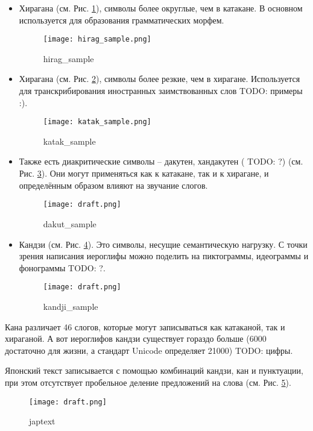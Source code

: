 \documentclass[14pt,russian]{extreport}
\theoremstyle{definition}
\newcommand{\todo}[1]{}
\renewcommand{\todo}[1]{{\color{red} TODO: {#1}}}
\begin{document}
\begin{itemize}
	\item Хирагана (см. Рис. \ref{fig:hirag_sample}), символы более округлые, чем в катакане. В основном используется для образования грамматических морфем.
	\begin{figure}[H]
		\centering
		\texttt{[image: hirag\_sample.png]}
		\caption{hirag\_sample}
		\label{fig:hirag_sample}
	\end{figure}
	
	\item Хирагана (см. Рис. \ref{fig:katak_sample}), символы более резкие, чем в хирагане. Используется для транскрибирования иностранных заимствованных слов \todo{примеры :)}.
	\begin{figure}[H]
		\centering
		\texttt{[image: katak\_sample.png]}
		\caption{katak\_sample}
		\label{fig:katak_sample}
	\end{figure}

	\item Также есть диакритические символы -- дакутен, хандакутен (\todo{?}) (см. Рис. \ref{fig:dakut_sample}). Они могут применяться как к катакане, так и к хирагане, и определённым образом влияют на звучание слогов.
	\begin{figure}[H]
		\centering
		\texttt{[image: draft.png]}
		\caption{dakut\_sample}
		\label{fig:dakut_sample}
	\end{figure}

	\item Кандзи (см. Рис. \ref{fig:kandji_sample}). Это символы, несущие семантическую нагрузку. С точки зрения написания иероглифы можно поделить на пиктограммы, идеограммы и фонограммы \todo{?}. 
	\begin{figure}[H]
		\centering
		\texttt{[image: draft.png]}
		\caption{kandji\_sample}
		\label{fig:kandji_sample}
	\end{figure}
\end{itemize}

Кана различает 46 слогов, которые могут записываться как катаканой, так и хираганой. А вот иероглифов кандзи существует гораздо больше (6000 достаточно для жизни, а стандарт Unicode определяет 21000) \todo{цифры}.

Японский текст записывается с помощью комбинаций кандзи, кан и пунктуации, при этом отсутствует пробельное деление предложений на слова (см. Рис. \ref{fig:japtext_sample}).
	\begin{figure}[H]
	\centering
	\texttt{[image: draft.png]}
	\caption{japtext}
	\label{fig:japtext_sample}
\end{figure}
\end{document}
